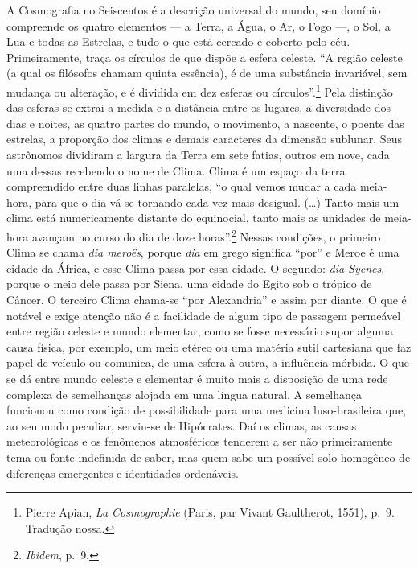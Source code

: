 A Cosmografia no Seiscentos é a descrição universal do mundo, seu
domínio compreende os quatro elementos --- a Terra, a Água, o Ar, o Fogo
---, o Sol, a Lua e todas as Estrelas, e tudo o que está cercado e
coberto pelo céu. Primeiramente, traça os círculos de que dispõe a
esfera celeste. ``A região celeste (a qual os filósofos chamam quinta
essência), é de uma substância invariável, sem mudança ou alteração, e é
dividida em dez esferas ou círculos''.\footnote{Pierre Apian, \textit{La
  Cosmographie} (Paris, par Vivant Gaultherot, 1551), p.~9. Tradução
  nossa.} Pela distinção das esferas se extrai a medida e a distância
entre os lugares, a diversidade dos dias e noites, as quatro partes do
mundo, o movimento, a nascente, o poente das estrelas, a proporção dos
climas e demais caracteres da dimensão sublunar. Seus astrônomos
dividiram a largura da Terra em sete fatias, outros em nove, cada uma
dessas recebendo o nome de Clima. Clima é um espaço da terra
compreendido entre duas linhas paralelas, ``o qual vemos mudar a cada
meia-hora, para que o dia vá se tornando cada vez mais desigual.
(\ldots{}) Tanto mais um clima está numericamente distante do
equinocial, tanto mais as unidades de meia-hora avançam no curso do dia
de doze horas''.\footnote{\textit{Ibidem}, p.~9.} Nessas condições, o
primeiro Clima se chama \textit{dia meroës}, porque \textit{dia} em grego
significa ``por'' e Meroe é uma cidade da África, e esse Clima passa por
essa cidade. O segundo: \textit{dia Syenes}, porque o meio dele passa por
Siena, uma cidade do Egito sob o trópico de Câncer. O terceiro Clima
chama-se ``por Alexandria'' e assim por diante. O que é notável e exige
atenção não é a facilidade de algum tipo de passagem permeável entre
região celeste e mundo elementar, como se fosse necessário supor alguma
causa física, por exemplo, um meio etéreo ou uma matéria sutil
cartesiana que faz papel de veículo ou comunica, de uma esfera à outra,
a influência mórbida. O que se dá entre mundo celeste e elementar é
muito mais a disposição de uma rede complexa de semelhanças alojada em
uma língua natural. A semelhança funcionou como condição de
possibilidade para uma medicina luso-brasileira que, ao seu modo
peculiar, serviu-se de Hipócrates. Daí os climas, as causas
meteorológicas e os fenômenos atmosféricos tenderem a ser não
primeiramente tema ou fonte indefinida de saber, mas quem sabe um
possível solo homogêneo de diferenças emergentes e identidades
ordenáveis.

